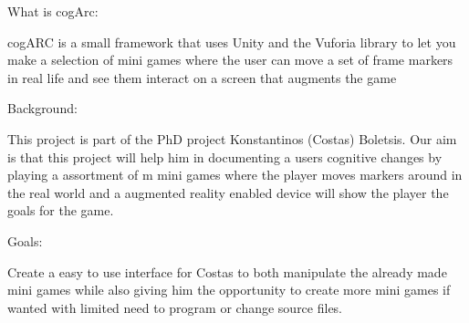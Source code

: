 What is cogArc:

cogARC is a small framework that uses Unity and the Vuforia library to let you make a selection of mini games where the user can move a set of frame markers in real life and see them interact on a screen that augments the game

Background:

This project is part of the PhD project Konstantinos (Costas) Boletsis. Our aim is that this project will help him in documenting a users cognitive changes by playing a assortment of m mini games where the player moves markers around in the real world and a augmented reality enabled device will show the player the goals for the game.


Goals:

Create a easy to use interface for Costas to both manipulate the already made mini games while also giving him the opportunity to create more mini games if wanted with limited need to program or change source files.